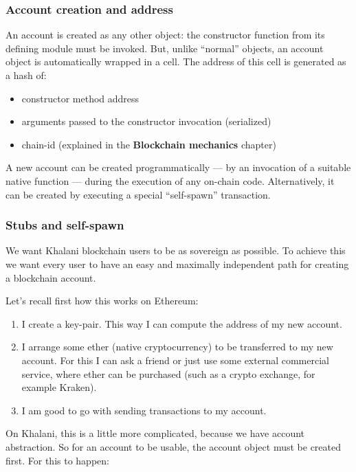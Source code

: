 \documentclass[a4paper]{article}
\begin{document}
\subsubsection{Account creation and address}

An account is created as any other object: the constructor function from its defining module must be invoked. But, unlike ``normal'' objects, an account object is automatically wrapped in a cell. The address of this cell is generated as a hash of:

\begin{itemize}
  \item constructor method address
  \item arguments passed to the constructor invocation (serialized)
  \item chain-id (explained in the \textbf{Blockchain mechanics} chapter)
\end{itemize}

A new account can be created programmatically --- by an invocation of a suitable native function --- during the execution of any on-chain code. Alternatively, it can be created by executing a special ``self-spawn'' transaction.

\subsubsection{Stubs and self-spawn}

We want Khalani blockchain users to be as sovereign as possible. To achieve this we want every user to have an easy and maximally independent path for creating a blockchain account.

Let's recall first how this works on Ethereum:

\begin{enumerate}
  \item I create a key-pair. This way I can compute the address of my new account.
  \item I arrange some ether (native cryptocurrency) to be transferred to my new account. For this I can ask a friend or just use some external commercial service, where ether can be purchased (such as a crypto exchange, for example Kraken).
  \item I am good to go with sending transactions to my account.
\end{enumerate}

On Khalani, this is a little more complicated, because we have account abstraction. So for an account to be usable, the account object must be created first. For this to happen:
\end{document}
